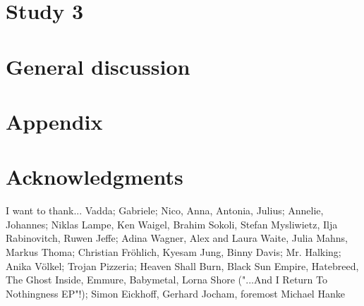\documentclass[english,12pt]{report}
\begin{document}
\begin{spacing}{1.5}
\chapter{Study 3}






\chapter{General discussion}






% 







\chapter{Appendix}





\chapter*{Acknowledgments}
I want to thank...
Vadda; Gabriele; Nico, Anna, Antonia, Julius; Annelie, Johannes;
%
Niklas Lampe, Ken Waigel, Brahim Sokoli, Stefan Mysliwietz, Ilja Rabinovitch,
Ruwen Jeffe;
Adina Wagner, Alex and Laura Waite, Julia Mahns, Markus Thoma;
Christian Fröhlich, Kyesam Jung, Binny Davis;
Mr. Halking;
Anika Völkel;
Trojan Pizzeria;
Heaven Shall Burn, Black Sun Empire, Hatebreed, The Ghost Inside, Emmure,
Babymetal, Lorna Shore ("...And I Return To Nothingness EP"!);
Simon Eickhoff, Gerhard Jocham, foremost Michael Hanke
%








\end{spacing}
\end{document}
